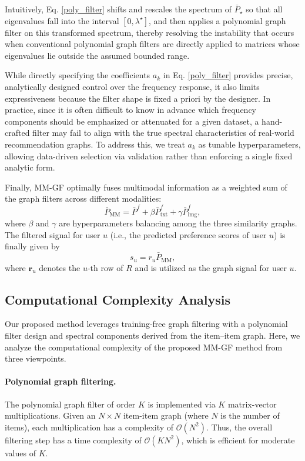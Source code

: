 \documentclass[a4paper,fleqn]{cas-sc}
\begin{document}
Intuitively, Eq. \eqref{poly_filter} shifts and rescales the spectrum of $\bar P_{\star}$ so that all eigenvalues fall into the interval $[0,\lambda^{\star}]$, and then applies a polynomial graph filter on this transformed spectrum, thereby resolving the instability that occurs when conventional polynomial graph filters are directly applied to matrices whose eigenvalues lie outside the assumed bounded range.

While directly specifying the coefficients $a_k$ in Eq. \eqref{poly_filter} provides precise, analytically designed control over the frequency response, it also limits expressiveness because the filter shape is fixed a priori by the designer. In practice, since it is often difficult to know in advance which frequency components should be emphasized or attenuated for a given dataset, a hand-crafted filter may fail to align with the true spectral characteristics of real-world recommendation graphs. To address this, we treat $a_k$ as tunable hyperparameters, allowing data-driven selection via validation rather than enforcing a single fixed analytic form.

Finally, \textsf{MM-GF} optimally fuses multimodal information as a weighted sum of the graph filters across different modalities:
\begin{equation}
\label{beta_gamma}
\bar{P}_{\text{MM}} = \bar{P}^f + \beta \bar{P}_{\text{txt}}^f + \gamma \bar{P}_{\text{img}}^f,
\end{equation}
where $\beta$ and $\gamma$ are hyperparameters balancing among the three similarity graphs. The filtered signal for user $u$ (i.e., the predicted preference scores of user $u$) is finally given by
\begin{equation}
s_u = r_u \bar{P}_{\text{MM}},
\end{equation}
where ${\mathbf{r}}_{u}$ denotes the $u$-th row of $R$ and is utilized as the graph signal for user $u$.




\subsection{Computational Complexity Analysis}

Our proposed method leverages training-free graph filtering with a polynomial filter design and spectral components derived from the item--item graph. Here, we analyze the computational complexity of the proposed \textsf{MM-GF} method from three viewpoints.

\paragraph{Polynomial graph filtering.} The polynomial graph filter of order $K$ is implemented via $K$ matrix-vector multiplications. Given an $N \times N$ item-item graph (where $N$ is the number of items), each multiplication has a complexity of $\mathcal{O}(N^2)$. Thus, the overall filtering step has a time complexity of $\mathcal{O}(KN^2)$, which is efficient for moderate values of $K$.
\end{document}
